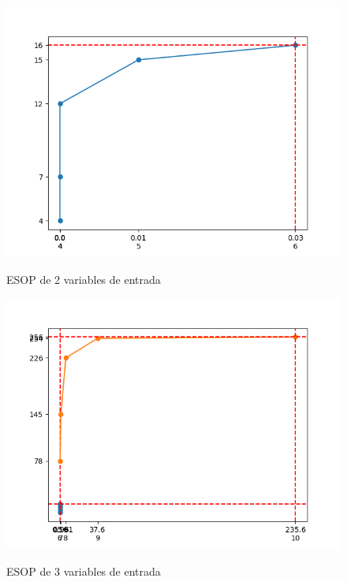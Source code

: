 \begin{figure}[h!]
    \centering
    \begin{minipage}{0.5\textwidth}
        \centering
        \includegraphics[width=\linewidth]{img/2_variables.png}
        \parbox{\linewidth}{\centering ESOP de 2 variables de entrada}
    \end{minipage}%
    \begin{minipage}{0.5\textwidth}
        \centering
        \includegraphics[width=\linewidth]{img/3_variables.png}
        \parbox{\linewidth}{\centering ESOP de 3 variables de entrada}
    \end{minipage}
    \vspace{1em} %


\end{figure}
